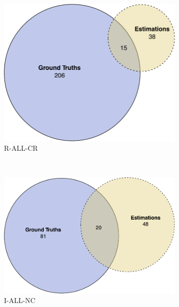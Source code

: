 \begin{figure}[h]
\begin{subfigure}[b]{0.475\textwidth}
    \includegraphics[width=\textwidth]{images/evaluation/ocr_overlap_r_all_cr}
    \caption{R-ALL-CR}
    \label{fig:evaluation:results:ocr:r_all_cr}
  \end{subfigure}
  \hspace{\fill}
  \\
  \bigskip
  \bigskip
  \hspace{\fill}
  \begin{subfigure}[b]{0.475\textwidth}
    \includegraphics[width=\textwidth]{images/evaluation/ocr_overlap_i_all_nc}
    \caption{I-ALL-NC}
    \label{fig:evaluation:results:ocr:i_all_nc}
  \end{subfigure}
  \hspace{\fill}
  \begin{subfigure}[b]{0.475\textwidth}

\end{subfigure}
\end{figure}
